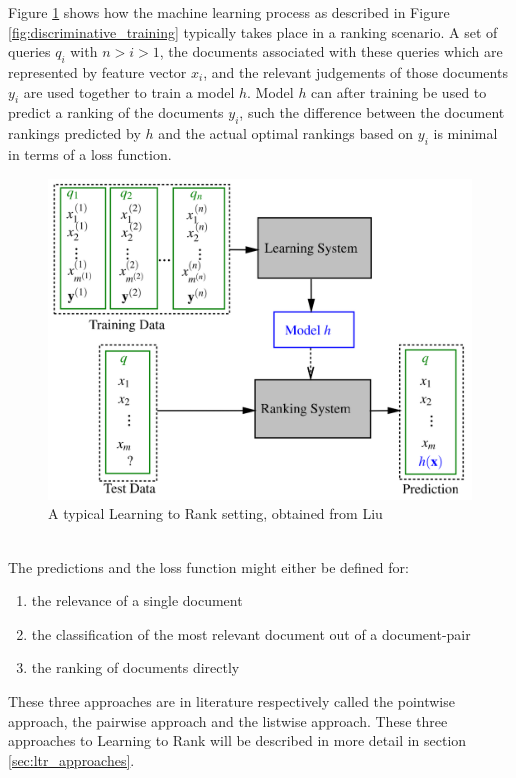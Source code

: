 Figure \ref{fig:ltr_framework} shows how the machine learning process as described in Figure \ref{fig:discriminative_training} typically takes place in a ranking scenario. A set of queries $q_i$ with $n > i > 1$, the documents associated with these queries which are represented by feature vector $x_i$, and the relevant judgements of those documents $y_i$ are used together to train a model $h$. Model $h$ can after training be used to predict a ranking of the documents $y_i$, such the difference between the document rankings predicted by $h$ and the actual optimal rankings based on $y_i$ is minimal in terms of a loss function.
\begin{figure}[!h]
\includegraphics[scale=0.25]{gfx/ltr_framework}
\caption{A typical Learning to Rank setting, obtained from Liu \cite{Liu2007}}
\label{fig:ltr_framework}
\end{figure}\\

The predictions and the loss function might either be defined for:
\begin{enumerate}
\item the relevance of a single document
\item the classification of the most relevant document out of a document-pair
\item the ranking of documents directly
\end{enumerate}
These three approaches are in literature respectively called the pointwise approach, the pairwise approach and the listwise approach. These three approaches to Learning to Rank will be described in more detail in section \ref{sec:ltr_approaches}.

